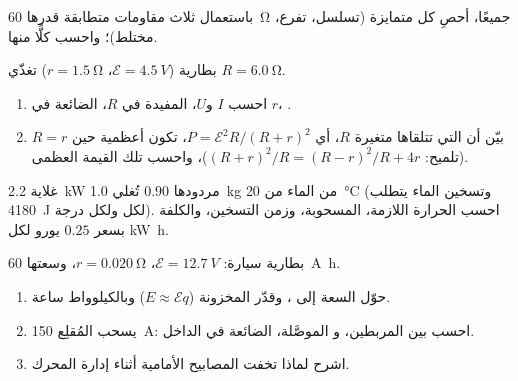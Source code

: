 \begin{exercise}[$\star\star\star$]\label{exo:g11:circuits-and-power:12}
باستعمال ثلاث مقاومات متطابقة قدرها \qty{60}{\ohm} جميعًا، أحصِ كل
 متمايزة (تسلسل، تفرع، مختلط)؛ واحسب كلًّا منها.
\end{exercise}

\begin{exercise}[$\star\star\star$]\label{exo:g11:circuits-and-power:13}
بطارية ($\mathcal{E} = \qty{4.5}{V}$، $r = \qty{1.5}{\ohm}$) تغذّي
 $R = \qty{6.0}{\ohm}$.
\begin{enumerate}
  \item احسب $I$ و$U$،  المفيدة في $R$،  الضائعة في $r$،
        .
  \item بيّن أن  التي تتلقاها  متغيرة $R$،
        أي $P = \mathcal{E}^2 R/(R+r)^2$، تكون أعظمية حين $R = r$ (تلميح:
        $(R+r)^2/R = (R-r)^2/R + 4r$)، واحسب تلك القيمة العظمى.
\end{enumerate}
\end{exercise}

\begin{exercise}[$\star\star\star$]\label{exo:g11:circuits-and-power:14}
غلاية \qty{2.2}{kW} مردودها $0.90$ تُغلي \qty{1.0}{kg} من الماء
من \qty{20}{\degreeCelsius} (وتسخين الماء يتطلب
\qty{4180}{J} لكل  ولكل درجة). احسب الحرارة اللازمة،  المسحوبة، وزمن التسخين، والكلفة بسعر $0.25$ يورو
لكل \unit{kW.h}.
\end{exercise}

\begin{exercise}[$\star\star\star$]\label{exo:g11:circuits-and-power:15}
بطارية سيارة: $\mathcal{E} = \qty{12.7}{V}$، $r = \qty{0.020}{\ohm}$،
وسعتها \qty{60}{A.h}.
\begin{enumerate}
  \item حوّل السعة إلى ، وقدّر  المخزونة
        ($E \approx \mathcal{E} q$)  وبالكيلوواط ساعة.
  \item يسحب المُقلِع \qty{150}{A}: احسب  بين المربطين، و
         الموصَّلة،  الضائعة في الداخل.
  \item اشرح لماذا تخفت المصابيح الأمامية أثناء إدارة المحرك.
\end{enumerate}
\end{exercise}

